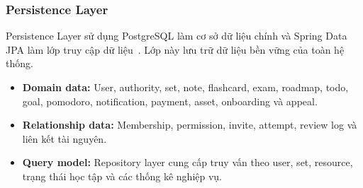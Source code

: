 \subsubsection{Persistence Layer}
\label{subsubsec:persistence-context}

Persistence Layer sử dụng PostgreSQL làm cơ sở dữ liệu chính và Spring Data JPA làm lớp truy cập dữ liệu~\cite{springdatajpa,postgresqlabout}. Lớp này lưu trữ dữ liệu bền vững của toàn hệ thống.

\begin{itemize}
    \item \textbf{Domain data:} User, authority, set, note, flashcard, exam, roadmap, todo, goal, pomodoro, notification, payment, asset, onboarding và appeal.
    \item \textbf{Relationship data:} Membership, permission, invite, attempt, review log và liên kết tài nguyên.
    \item \textbf{Query model:} Repository layer cung cấp truy vấn theo user, set, resource, trạng thái học tập và các thống kê nghiệp vụ.
\end{itemize}